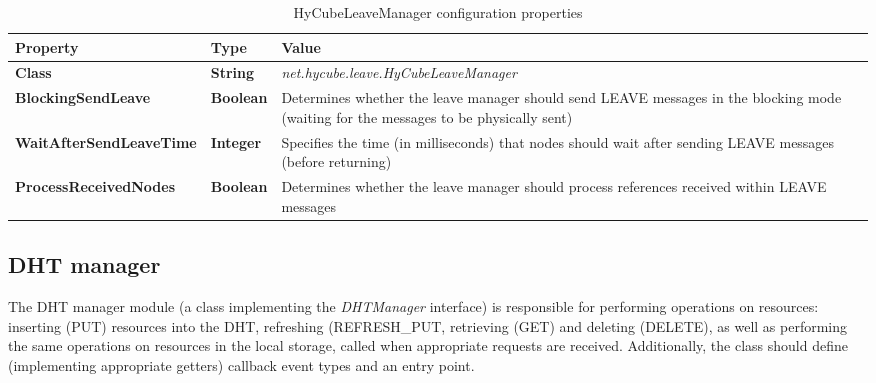 \begin{table}
\scriptsize
\begin{center}
\begin{tabular}{p{5cm} p{1.5cm} p{8.0cm}}
	\hline
	\textbf{Property}						& \textbf{Type}					& \textbf{Value}					\\[1mm]
    \hline
	\textbf{Class}							& \textbf{String}				& \textit{net.hycube.leave.HyCubeLeaveManager}									\\[1.5mm]	
    \textbf{BlockingSendLeave}				& \textbf{Boolean}				& Determines whether the leave manager should send LEAVE messages in the blocking mode (waiting for the messages to be physically sent)		\\[1.5mm]
	\textbf{WaitAfterSendLeaveTime}			& \textbf{Integer}				& Specifies the time (in milliseconds) that nodes should wait after sending LEAVE messages (before returning)			\\[1.5mm]
	\textbf{ProcessReceivedNodes}			& \textbf{Boolean}				& Determines whether the leave manager should process references received within LEAVE messages							\\[1.5mm]
    \hline
\end{tabular}
\end{center}
\caption{HyCubeLeaveManager configuration properties}
\label{tab:libHyCubeLeaveManager}
\end{table}






\subsection{DHT manager}
\label{sec:libDHTManager}

The DHT manager module (a class implementing the \emph{DHTManager} interface) is responsible for performing operations on resources: inserting (PUT) resources into the DHT, refreshing (REFRESH\_PUT, retrieving (GET) and deleting (DELETE), as well as performing the same operations on resources in the local storage, called when appropriate requests are received. Additionally, the class should define (implementing appropriate getters) callback event types and an entry point.

